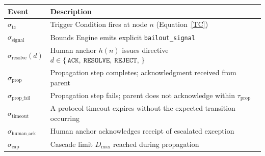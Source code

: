 \medskip
\noindent\begin{minipage}{\linewidth}
\label{tab:bp-events}
\medskip
\noindent\begin{tabular}{lp{7.5cm}}
\toprule
\textbf{Event} & \textbf{Description} \\
\midrule
$\sigma_{\text{tc}}$        & Trigger Condition fires at node $n$ (Equation~\ref{TC}) \\
$\sigma_{\text{signal}}$    & Bounds Engine emits explicit \texttt{bailout\_signal} \\
$\sigma_{\text{resolve}}(d)$ & Human anchor $h(n)$ issues directive $d \in \{\,\texttt{ACK},\ \texttt{RESOLVE},\ \texttt{REJECT},\,\}$ \\
$\sigma_{\text{prop}}$       & Propagation step completes; acknowledgment received from parent \\
$\sigma_{\text{prop\_fail}}$ & Propagation step fails; parent does not acknowledge within $\tau_{\text{prop}}$ \\
$\sigma_{\text{timeout}}$    & A protocol timeout expires without the expected transition occurring \\
$\sigma_{\text{human\_ack}}$ & Human anchor acknowledges receipt of escalated exception \\
$\sigma_{\text{cap}}$        & Cascade limit $D_{\max}$ reached during propagation \\
\bottomrule
\end{tabular}
\end{minipage}

